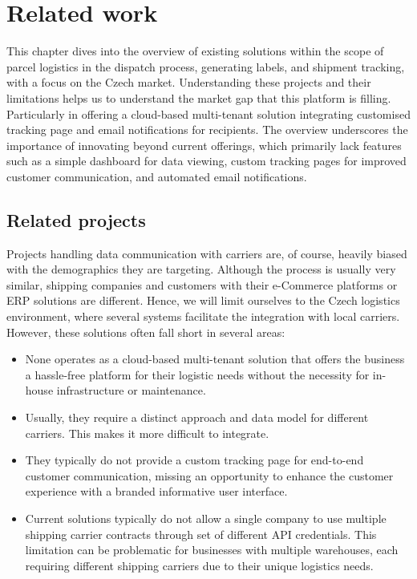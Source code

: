 \chapter{Related work}
\label{chap:related-work}
This chapter dives into the overview of existing solutions within the scope of parcel logistics in the dispatch process, generating labels, and shipment tracking, with a focus on the Czech market.
Understanding these projects and their limitations helps us to understand the market gap that this platform is filling.
Particularly in offering a cloud-based multi-tenant solution integrating customised tracking page and email notifications for recipients.
The overview underscores the importance of innovating beyond current offerings, which primarily lack features such as a simple dashboard for data viewing, custom tracking pages for improved customer communication, and automated email notifications.

\section{Related projects}
\label{sec:related-projects}

Projects handling data communication with carriers are, of course, heavily biased with the demographics they are targeting. 
Although the process is usually very similar, shipping companies and customers with their e-Commerce platforms or \ac{ERP} solutions are different.
Hence, we will limit ourselves to the Czech logistics environment, where several systems facilitate the integration with local carriers. However, these solutions often fall short in several areas:
\begin{itemize}
    \item None operates as a cloud-based multi-tenant solution that offers the business a hassle-free platform for their logistic needs without the necessity for in-house infrastructure or maintenance.
    \item Usually, they require a distinct approach and data model for different carriers. This makes it more difficult to integrate.
    \item They typically do not provide a custom tracking page for end-to-end customer communication, missing an opportunity to enhance the customer experience with a branded informative user interface.
    \item Current solutions typically do not allow a single company to use multiple shipping carrier contracts through set of different API credentials. This limitation can be problematic for businesses with multiple warehouses, each requiring different shipping carriers due to their unique logistics needs.
\end{itemize}

